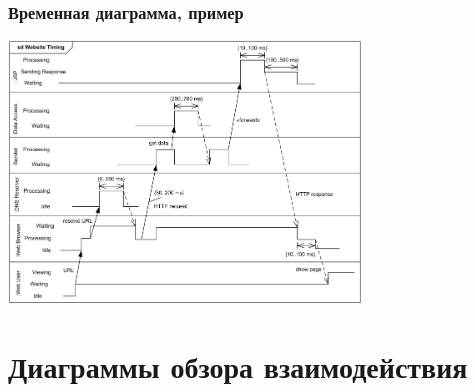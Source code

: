 \documentclass{../../slides-style}
\begin{document}
    \begin{frame}
        \frametitle{Временная диаграмма, пример}
        \begin{center}
            \includegraphics[width=0.7\textwidth]{timingDiagramExample.png}
        \end{center}
    \end{frame}

    \section{Диаграммы обзора взаимодействия}
\end{document}
